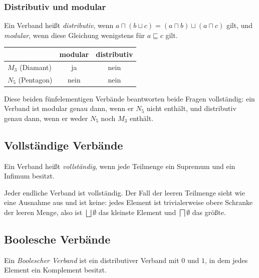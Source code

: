 \documentclass[12pt, a4paper]{article}
\begin{document}
\subsubsection{Distributiv und modular}

\begin{definitionbox}
Ein Verband heißt \emph{distributiv}, wenn
$a \sqcap (b \sqcup c) = (a \sqcap b) \sqcup (a \sqcap c)$ gilt, und
\emph{modular}, wenn diese Gleichung wenigstens für $a \sqsubseteq c$ gilt.
\end{definitionbox}

\begin{center}
\begin{tabular}{lcc}
\toprule
& modular & distributiv\\
\midrule
$M_3$ (Diamant) & ja & nein\\
$N_5$ (Pentagon) & nein & nein\\
\bottomrule
\end{tabular}
\end{center}

Diese beiden fünfelementigen Verbände beantworten beide Fragen vollständig:
ein Verband ist modular genau dann, wenn er $N_5$ nicht enthält, und
distributiv genau dann, wenn er weder $N_5$ noch $M_3$ enthält.

\subsection{Vollständige Verbände}

\begin{definitionbox}
Ein Verband heißt \emph{vollständig}, wenn jede Teilmenge ein Supremum und
ein Infimum besitzt.
\end{definitionbox}

Jeder endliche Verband ist vollständig. Der Fall der leeren Teilmenge sieht
wie eine Ausnahme aus und ist keine: jedes Element ist trivialerweise obere
Schranke der leeren Menge, also ist $\bigsqcup \emptyset$ das kleinste
Element und $\bigsqcap \emptyset$ das größte.

\subsection{Boolesche Verbände}

\begin{definitionbox}
Ein \emph{Boolescher Verband} ist ein distributiver Verband mit $0$ und $1$,
in dem jedes Element ein Komplement besitzt.
\end{definitionbox}
\end{document}
